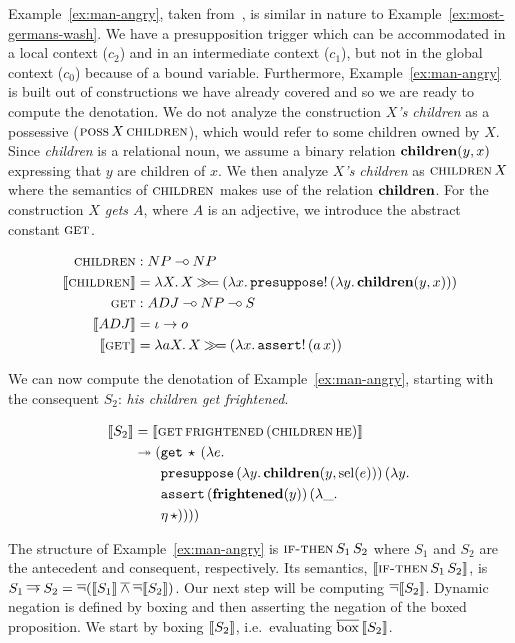 Example~\ref{ex:man-angry}, taken from~\cite{van1992presupposition}, is
similar in nature to Example~\ref{ex:most-germans-wash}. We have a
presupposition trigger which can be accommodated in a local context ($c_2$)
and in an intermediate context ($c_1$), but not in the global context
($c_0$) because of a bound variable. Furthermore,
Example~\ref{ex:man-angry} is built out of constructions we have already
covered and so we are ready to compute the denotation. We do not analyze
the construction \emph{$X$'s children} as a possessive
($\textsc{poss}\,X\,\textsc{children}$), which would refer to some children
owned by $X$. Since \emph{children} is a relational noun, we assume a
binary relation $\textbf{children}(y, x)$ expressing that $y$ are children of
$x$. We then analyze \emph{$X$'s children} as $\textsc{children}\,X$
where the semantics of $\textsc{children}$ makes use of the relation
$\textbf{children}$. For the construction \emph{$X$ gets $A$}, where $A$ is an
adjective, we introduce the abstract constant $\textsc{get}$.

\begin{align*}
  \textsc{children} &: NP \mathbin{{-}\mkern-3.5mu{\circ}} NP \\
  \llbracket \textsc{children} \rrbracket &= \lambda X.\, X \mathbin{\gg\!=} (\lambda x.\, \mathtt{presuppose}!\,(\lambda y.\, \textbf{children}(y, x))) \\
  \textsc{get} &: ADJ \mathbin{{-}\mkern-3.5mu{\circ}} NP \mathbin{{-}\mkern-3.5mu{\circ}} S \\
  \llbracket ADJ \rrbracket &= \iota \to o \\
  \llbracket \textsc{get} \rrbracket &= \lambda a X.\, X \mathbin{\gg\!=} (\lambda x.\, \mathtt{assert}!\,(a\,x))
\end{align*}

We can now compute the denotation of Example~\ref{ex:man-angry}, starting
with the consequent $S_2$: \emph{his children get frightened}.

\begin{align*}
  \llbracket S_2 \rrbracket
  &= \llbracket \textsc{get}\,\textsc{frightened}\,(\textsc{children}\,\textsc{he}) \rrbracket \\
  &\twoheadrightarrow 
    \begin{aligned}[t]
      (&\mathtt{get}\,\star\,(\lambda e.\,  \\
       &\mathtt{presuppose}\,(\lambda y.\, \textbf{children}(y, \operatorname{sel}(e)))\,(\lambda y.\,  \\
       &\mathtt{assert}\,(\textbf{frightened}(y))\,(\lambda \_.\,  \\
       &\eta\,\star))))
    \end{aligned}
\end{align*}

The structure of Example~\ref{ex:man-angry} is
$\textsc{if-then}\,S_1\,S_2$ where $S_1$ and $S_2$ are the antecedent
and consequent, respectively. Its semantics,
$\llbracket \textsc{if-then}\,S_1\,S_2 \rrbracket$, is
$S_1 \mathbin{\overline{\to}} S_2 = \mathop{\overline{\lnot}} (\llbracket S_1 \rrbracket \mathbin{\overline{\land}} \mathop{\overline{\lnot}} \llbracket S_2 \rrbracket)$. Our next step
will be computing $\mathop{\overline{\lnot}} \llbracket S_2 \rrbracket$. Dynamic negation is defined by boxing
and then asserting the negation of the boxed proposition. We start by
boxing $\llbracket S_2 \rrbracket$, i.e.\ evaluating $\overline{\mathrm{box}}\,\llbracket S_2 \rrbracket$.

